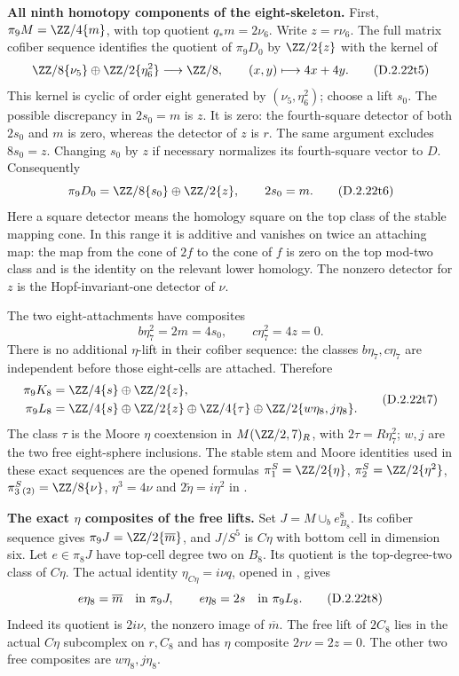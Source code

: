 \medskip\noindent
\textbf{All ninth homotopy components of the eight-skeleton.}
First, $\pi_9M=\ZZ/4\{m\}$, with top quotient
$q_*m=2\nu_6$.  Write $z=r\nu_6$.
The full matrix cofiber sequence identifies the quotient of
$\pi_9D_0$ by $\ZZ/2\{z\}$ with the kernel of
\[
 \ZZ/8\{\nu_5\}\oplus\ZZ/2\{\eta_6^2\}
       \longrightarrow\ZZ/8,
       \qquad (x,y)\longmapsto4x+4y.
 \tag{D.2.22t5}
\]
This kernel is cyclic of order eight generated by
$(\nu_5,\eta_6^2)$; choose a lift $s_0$.
The possible discrepancy in $2s_0=m$ is $z$.
It is zero: the fourth-square detector of both $2s_0$ and
$m$ is zero, whereas the detector of $z$ is $r$.
The same argument excludes $8s_0=z$.
Changing $s_0$ by $z$ if necessary normalizes its
fourth-square vector to $D$.  Consequently
\[
 \pi_9D_0=\ZZ/8\{s_0\}\oplus\ZZ/2\{z\},
       \qquad2s_0=m.
 \tag{D.2.22t6}
\]
Here a square detector means the homology square on the top
class of the stable mapping cone.  In this range it is additive
and vanishes on twice an attaching map: the map from the cone
of $2f$ to the cone of $f$ is zero on the top mod-two class
and is the identity on the relevant lower homology.
The nonzero detector for $z$ is the Hopf-invariant-one
detector of $\nu$.

The two eight-attachments have composites
\[
 b\eta_7^2=2m=4s_0,
       \qquad c\eta_7^2=4z=0.
\]
There is no additional $\eta$-lift in their cofiber sequence:
the classes $b\eta_7,c\eta_7$ are independent before those
eight-cells are attached.  Therefore
\[
 \begin{split}
 \pi_9K_8&=\ZZ/4\{s\}\oplus\ZZ/2\{z\},\\
 \pi_9L_8&=\ZZ/4\{s\}\oplus\ZZ/2\{z\}
     \oplus\ZZ/4\{\tau\}
     \oplus\ZZ/2\{w\eta_8,j\eta_8\}.
 \end{split}
 \tag{D.2.22t7}
\]
The class $\tau$ is the Moore $\eta$ coextension in
$M(\ZZ/2,7)_R$, with $2\tau=R\eta_7^2$;
$w,j$ are the two free eight-sphere inclusions.
The stable stem and Moore identities used in these exact
sequences are the opened formulas
$\pi_1^S=\ZZ/2\{\eta\}$,
$\pi_2^S=\ZZ/2\{\eta^2\}$,
$\pi_3^S{}_{(2)}=\ZZ/8\{\nu\}$,
$\eta^3=4\nu$ and $2\widetilde\eta=i\eta^2$ in
\cite[\S2, (2.1)--(2.2), p.~149]{I_Oka1986}.

\medskip\noindent
\textbf{The exact $\eta$ composites of the free lifts.}
Set $J=M\cup_b e^8_{B_8}$.
Its cofiber sequence gives $\pi_9J=\ZZ/2\{\overline m\}$,
and $J/S^5$ is $C\eta$ with bottom cell in dimension six.
Let $e\in\pi_8J$ have top-cell degree two on $B_8$.
Its quotient is the top-degree-two class of $C\eta$.
The actual identity
$\eta_{C\eta}=i\nu q$, opened in
\cite[(8.4), p.~1279]{EH5AngeltveitRognes2005}, gives
\[
 e\eta_8=\overline m\quad\hbox{in }\pi_9J,
       \qquad e\eta_8=2s\quad\hbox{in }\pi_9L_8.
 \tag{D.2.22t8}
\]
Indeed its quotient is $2i\nu$, the nonzero image of
$\overline m$.  The free lift of $2C_8$ lies in the actual
$C\eta$ subcomplex on $r,C_8$ and has $\eta$ composite
$2r\nu=2z=0$.  The other two free composites are
$w\eta_8,j\eta_8$.

